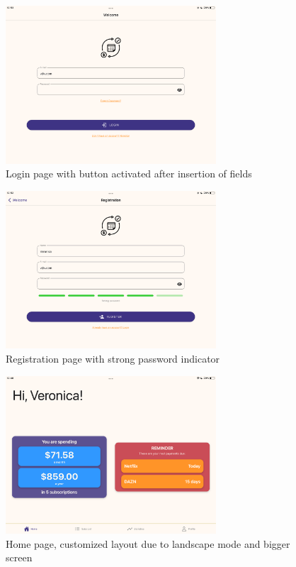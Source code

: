 \documentclass[12pt]{article}
\begin{document}
\begin{figure}[h!]
    \begin{center}
        \includegraphics[width=0.7\textwidth, clip]{../../assets/tablet/loginActive.png}
    \end{center}
    \caption{Login page with button activated after insertion of fields}
    \label{fig:tloginActive}
\end{figure}

\begin{figure}[h!]
    \begin{center}
        \includegraphics[width=0.7\textwidth, clip]{../../assets/tablet/reg.png}
    \end{center}
    \caption{Registration page with strong password indicator}
    \label{fig:treg}
\end{figure}

\begin{figure}[h!]
    \begin{center}
        \includegraphics[width=0.7\textwidth, clip]{../../assets/tablet/home.png}
    \end{center}
    \caption{Home page, customized layout due to landscape mode and bigger screen}
    \label{fig:thome}
\end{figure}
\end{document}

